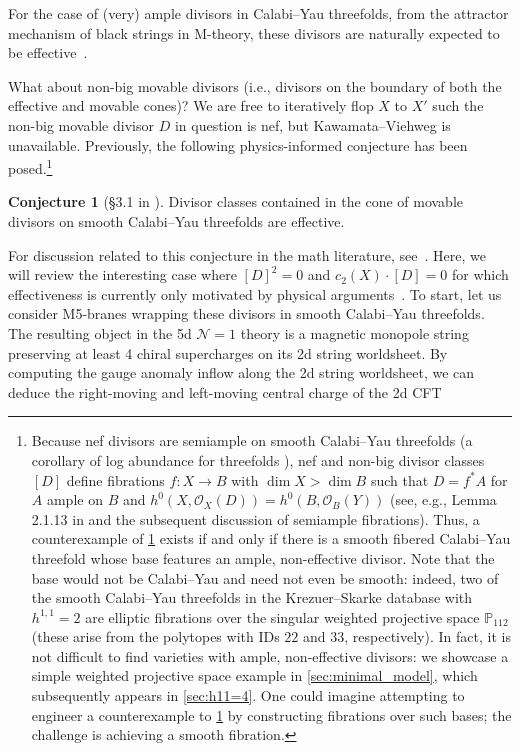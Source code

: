 \documentclass[11pt,dvipsnames]{article}
\theoremstyle{definition}
\newtheorem{conjecture}[theorem]{Conjecture}
\newcommand{\cN}{\mathcal{N}}
\begin{document}
For the case of (very) ample divisors in Calabi--Yau threefolds, from the attractor mechanism of black strings in M-theory, these divisors are naturally expected to be effective~\cite{Maldacena:1997de}.

What about non-big movable divisors (i.e., divisors on the boundary of both the effective and movable cones)? We are free to iteratively flop $X$ to $X'$ such the non-big movable divisor $D$ in question is nef, but Kawamata--Viehweg is unavailable. 
Previously, the following physics-informed conjecture has been posed.\footnote{Because nef divisors are semiample on smooth Calabi--Yau threefolds (a corollary of log abundance for threefolds \cite{keel1994log}), nef and non-big divisor classes $[D]$ define fibrations $f : X \to B$ with $\dim X > \dim B$ such that $D = f^* A$ for $A$ ample on $B$ and $h^0(X, \mathcal{O}_X(D)) = h^0(B, \mathcal{O}_B(Y))$ (see, e.g., Lemma 2.1.13 in \cite{lazarsfeld2017positivity} and the subsequent discussion of semiample fibrations). Thus, a counterexample of \cref{conj:nonbig_movable_CY} exists if and only if there is a smooth fibered Calabi--Yau threefold whose base features an ample, non-effective divisor. Note that the base would not be Calabi--Yau and need not even be smooth: indeed, two of the smooth Calabi--Yau threefolds in the Krezuer--Skarke database with $h^{1,1} = 2$ are elliptic fibrations over the singular weighted projective space $\mathbb{P}_{112}$ (these arise from the polytopes with IDs $22$ and $33$, respectively). In fact, it is not difficult to find varieties with ample, non-effective divisors: we showcase a simple weighted projective space example in \cref{sec:minimal_model}, which subsequently appears in \cref{sec:h11=4}. One could imagine attempting to engineer a counterexample to \cref{conj:nonbig_movable_CY} by constructing fibrations over such bases; the challenge is achieving a smooth fibration.}
\begin{conjecture}[\S3.1 in \cite{Katz:2020ewz}]
    Divisor classes contained in the cone of movable divisors on smooth Calabi--Yau threefolds are effective. 
    \label{conj:nonbig_movable_CY}
\end{conjecture}
For discussion related to this conjecture in the math literature, see~\cite{lazarsfeld2017positivity, Oguiso}. 
Here, we will review the interesting case where $[D]^2 = 0$ and $c_2(X) \cdot [D] = 0$ for which effectiveness is currently only motivated by physical arguments~\cite{Katz:2020ewz}. To start, let us consider M5-branes wrapping these divisors in smooth Calabi--Yau threefolds. The resulting object in the 5d $\cN=1$ theory is a magnetic monopole string preserving at least 4 chiral supercharges on its 2d string worldsheet. By computing the gauge anomaly inflow along the 2d string worldsheet, we can deduce the right-moving and left-moving central charge of the 2d CFT~\cite{Maldacena:1997de} 
\end{document}
